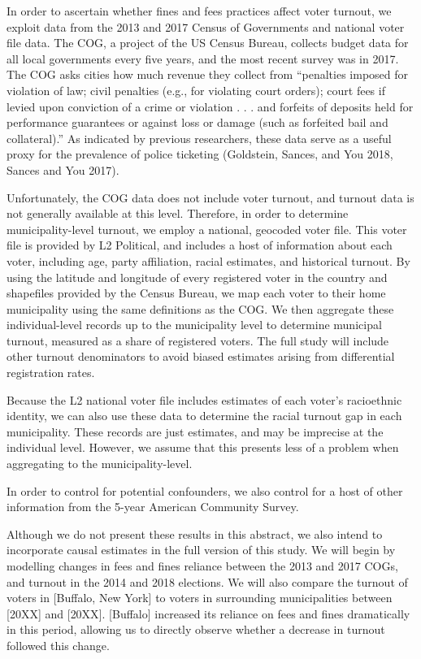 \documentclass[
  12pt,
]{article}
\begin{document}
In order to ascertain whether fines and fees practices affect voter turnout, we exploit data from the 2013 and 2017 Census of Governments and national voter file data. The COG, a project of the US Census Bureau, collects budget data for all local governments every five years, and the most recent survey was in 2017. The COG asks cities how much revenue they collect from ``penalties imposed for violation of law; civil penalties (e.g., for violating court orders); court fees if levied upon conviction of a crime or violation . . . and forfeits of deposits held for performance guarantees or against loss or damage (such as forfeited bail and collateral).'' As indicated by previous researchers, these data serve as a useful proxy for the prevalence of police ticketing (Goldstein, Sances, and You 2018, Sances and You 2017).

Unfortunately, the COG data does not include voter turnout, and turnout data is not generally available at this level. Therefore, in order to determine municipality-level turnout, we employ a national, geocoded voter file. This voter file is provided by L2 Political, and includes a host of information about each voter, including age, party affiliation, racial estimates, and historical turnout. By using the latitude and longitude of every registered voter in the country and shapefiles provided by the Census Bureau, we map each voter to their home municipality using the same definitions as the COG. We then aggregate these individual-level records up to the municipality level to determine municipal turnout, measured as a share of registered voters. The full study will include other turnout denominators to avoid biased estimates arising from differential registration rates.

Because the L2 national voter file includes estimates of each voter's racioethnic identity, we can also use these data to determine the racial turnout gap in each municipality. These records are just estimates, and may be imprecise at the individual level. However, we assume that this presents less of a problem when aggregating to the municipality-level.

In order to control for potential confounders, we also control for a host of other information from the 5-year American Community Survey.

Although we do not present these results in this abstract, we also intend to incorporate causal estimates in the full version of this study. We will begin by modelling changes in fees and fines reliance between the 2013 and 2017 COGs, and turnout in the 2014 and 2018 elections. We will also compare the turnout of voters in {[}Buffalo, New York{]} to voters in surrounding municipalities between {[}20XX{]} and {[}20XX{]}. {[}Buffalo{]} increased its reliance on fees and fines dramatically in this period, allowing us to directly observe whether a decrease in turnout followed this change.
\end{document}
